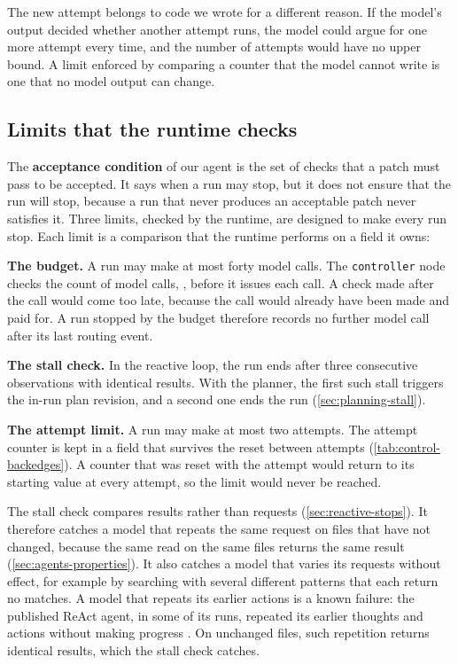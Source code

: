 The new attempt belongs to code we wrote for a different reason. If the model's output decided
whether another attempt runs, the model could argue for one more attempt every time, and the number
of attempts would have no upper bound. A limit enforced by comparing a counter that the model
cannot write is one that no model output can change.

\subsection{Limits that the runtime checks}
\label{sec:control-limits}

The \textbf{acceptance condition} of our agent is the set of checks that a patch must pass to be
accepted. It says when a run may stop, but it does not ensure that the run will stop, because a run
that never produces an acceptable patch never satisfies it. Three limits, checked by the runtime,
are designed to make every run stop. Each limit is a comparison that the runtime performs on a
field it owns:

\bi
\item \textbf{The budget.} A run may make at most forty model calls. The
\texttt{controller} node checks the count of model calls, , before it issues
each call. A check made after the call would come too late, because the call would already have
been made and paid for. A run stopped by the budget therefore records no further model call after
its last routing event.
\item \textbf{The stall check.} In the reactive loop, the run ends after three consecutive
observations with identical results. With the planner, the first such stall triggers the in-run
plan revision, and a second one ends the run (\cref{sec:planning-stall}).
\item \textbf{The attempt limit.} A run may make at most two attempts. The attempt counter is kept
in a field that survives the reset between attempts (\cref{tab:control-backedges}). A counter that
was reset with the attempt would return to its starting value at every attempt, so the limit would
never be reached.
\ei

The stall check compares results rather than requests (\cref{sec:reactive-stops}). It therefore
catches a model that repeats the same request on files that have not changed, because the same read
on the same files returns the same result (\cref{sec:agents-properties}). It also catches a model
that varies its requests without effect, for example by searching with several different patterns
that each return no matches. A model that repeats its earlier actions is a known failure: the
published ReAct agent, in some of its runs, repeated its earlier thoughts and actions without making
progress \citep{yao2023react}. On unchanged files, such repetition returns identical results, which
the stall check catches.

